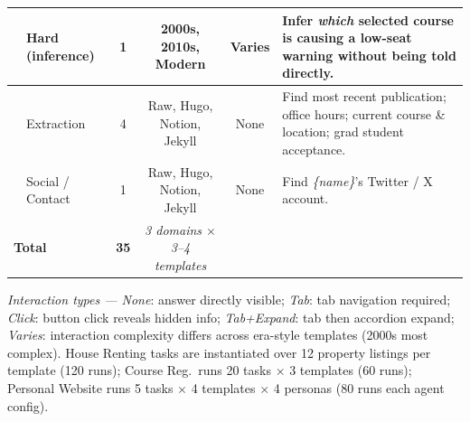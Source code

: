 \documentclass[10pt]{article}
\begin{document}
\begin{table}[ht]
\begin{tabularx}{\textwidth}{l l c c c X}
  & Hard (inference)       & 1 & 2000s, 2010s, Modern & Varies
  & Infer \textit{which} selected course is causing a low-seat warning without being told directly. \\

\midrule

\rowcolor{lightgray}
\multirow{2}{*}{Personal Website}
  & Extraction             & 4 & Raw, Hugo, Notion, Jekyll & None
  & Find most recent publication; office hours; current course \& location; grad student acceptance. \\

  & Social / Contact       & 1 & Raw, Hugo, Notion, Jekyll & None
  & Find \textit{\{name\}}'s Twitter / X account. \\

\midrule[\heavyrulewidth]

\multicolumn{2}{l}{\textbf{Total}} & \textbf{35} &
  \textit{3 domains $\times$ 3--4 templates} & & \\

\bottomrule
\end{tabularx}

\smallskip
\noindent\footnotesize
\textit{Interaction types — None}: answer directly visible; \textit{Tab}: tab navigation required;
\textit{Click}: button click reveals hidden info; \textit{Tab+Expand}: tab then accordion expand;
\textit{Varies}: interaction complexity differs across era-style templates (2000s most complex).
House Renting tasks are instantiated over 12 property listings per template (120 runs);
Course Reg.\ runs 20 tasks $\times$ 3 templates (60 runs);
Personal Website runs 5 tasks $\times$ 4 templates $\times$ 4 personas (80 runs each agent config).

\end{table}
\end{document}
